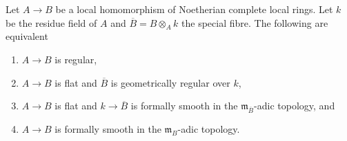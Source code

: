 \begin{proposition}
\label{proposition-fs-regular}
Let $A \to B$ be a local homomorphism of Noetherian complete local rings.
Let $k$ be the residue field of $A$ and $\overline{B} = B \otimes_A k$
the special fibre.
The following are equivalent
\begin{enumerate}
\item $A \to B$ is regular,
\item $A \to B$ is flat and $\overline{B}$ is geometrically regular
over $k$,
\item $A \to B$ is flat and $k \to \overline{B}$ is formally smooth
in the $\mathfrak m_{\overline{B}}$-adic topology, and
\item $A \to B$ is formally smooth in the $\mathfrak m_B$-adic
topology.
\end{enumerate}
\end{proposition}

